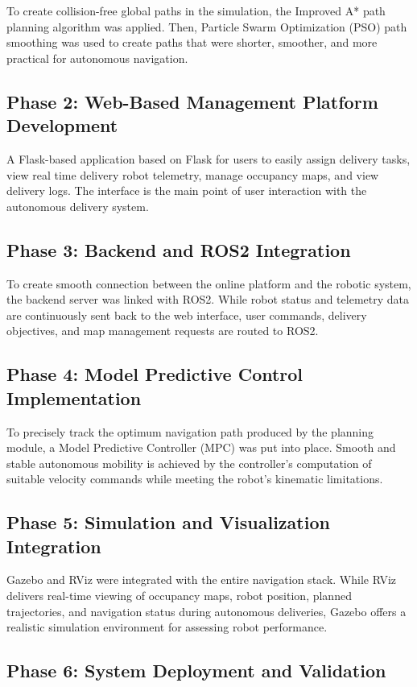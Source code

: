 To create collision-free global paths in the simulation, the Improved A* path planning algorithm was applied. Then, Particle Swarm Optimization (PSO) path smoothing was used to create paths that were shorter, smoother, and more practical for autonomous navigation.
\subsection*{Phase 2: Web-Based Management Platform Development}

A Flask-based application based on Flask for users to easily assign delivery tasks, view real time delivery robot telemetry, manage occupancy maps, and view delivery logs. The interface is the main point of user interaction with the autonomous delivery system.

\subsection*{Phase 3: Backend and ROS2 Integration}

To create smooth connection between the online platform and the robotic system, the backend server was linked with ROS2. While robot status and telemetry data are continuously sent back to the web interface, user commands, delivery objectives, and map management requests are routed to ROS2.

\subsection*{Phase 4: Model Predictive Control Implementation}

To precisely track the optimum navigation path produced by the planning module, a Model Predictive Controller (MPC) was put into place. Smooth and stable autonomous mobility is achieved by the controller's computation of suitable velocity commands while meeting the robot's kinematic limitations.

\subsection*{Phase 5: Simulation and Visualization Integration}
Gazebo and RViz were integrated with the entire navigation stack. While RViz delivers real-time viewing of occupancy maps, robot position, planned trajectories, and navigation status during autonomous deliveries, Gazebo offers a realistic simulation environment for assessing robot performance.


\subsection*{Phase 6: System Deployment and Validation}

